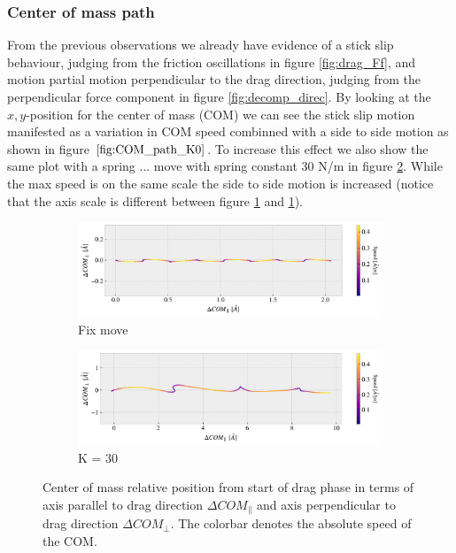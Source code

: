 \subsubsection{Center of mass path}
From the previous observations we already have evidence of a stick slip behaviour, judging from the friction oscillations in figure \ref{fig:drag_Ff}, and motion partial motion perpendicular to the drag direction, judging from the perpendicular force component in figure \ref{fig:decomp_direc}. By looking at the $x,y$-position for the center of mass (COM) we can see the stick slip motion manifested as a variation in COM speed combinned with a side to side motion as shown in figure $\ref{fig:COM_path_K0}$. To increase this effect we also show the same plot with a spring ... move with spring constant 30 N/m in figure \ref{fig:COM_path_K30}. While the max speed is on the same scale the side to side motion is increased (notice that the axis scale is different between figure \ref{fig:COM_path_K0} and \ref{fig:COM_path_K0}).


\begin{figure}[H]
  \centering
  \begin{subfigure}[b]{0.85\textwidth}
    \centering
    \includegraphics[width=\textwidth]{figures/baseline/COM_path_K0.pdf}
    \caption{Fix move}
    \label{fig:COM_path_K0}
  \end{subfigure}
  \hfill
  \begin{subfigure}[b]{0.85\textwidth}
      \centering
      \includegraphics[width=\textwidth]{figures/baseline/COM_path_K30.pdf}
      \caption{K = 30}
      \label{fig:COM_path_K30}
  \end{subfigure}
  \caption{Center of mass relative position from start of drag phase in terms of axis parallel to drag direction $\Delta COM_{\parallel}$ and axis perpendicular to drag direction $\Delta COM_{\perp}$. The colorbar denotes the absolute speed of the COM.}
  \label{fig:COM_path}
\end{figure}




